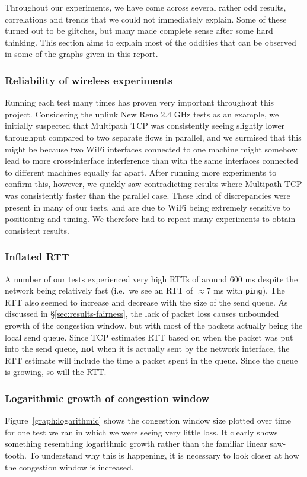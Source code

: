 Throughout our experiments, we have come across several rather odd results,
correlations and trends that we could not immediately explain. Some of these
turned out to be glitches, but many made complete sense after some hard
thinking. This section aims to explain most of the oddities that can be observed
in some of the graphs given in this report.

\subsubsection{Reliability of wireless experiments}
Running each test many times has proven very important throughout this project.
Considering the uplink New Reno 2.4 GHz tests as an example, we initially 
suspected that Multipath TCP was consistently seeing slightly lower 
throughput compared to two separate flows in parallel, and we surmised that
this might be because two 
WiFi interfaces connected to one machine might somehow lead to more 
cross-interface interference than with the same interfaces connected to 
different machines equally far apart. After running more experiments to confirm this, 
however, we quickly saw contradicting results where Multipath TCP was 
consistently faster than the parallel case. These kind of discrepancies were
present in many of our tests, and are due to WiFi being extremely sensitive to
positioning and timing. We therefore had to repeat many experiments to obtain
consistent results. 

\subsubsection{Inflated RTT}
A number of our tests experienced very high RTTs of around 600 ms despite the network
being relatively fast (i.e.\ we see an RTT of $\approx 7$ ms with \texttt{ping}).
The RTT also seemed to increase and decrease with the size of the send queue. As 
discussed in \S\ref{sec:results-fairness}, the lack of packet loss causes 
unbounded growth of the congestion window, but with most of the packets actually being
the local send queue. Since TCP estimates RTT based on when the packet was put into 
the send queue, \textbf{not} when it is actually sent by the network interface, 
the RTT estimate will include the time a packet spent in the queue. Since the 
queue is growing, so will the RTT.

\subsubsection{Logarithmic growth of congestion window}
Figure~\ref{graph:logarithmic} shows the congestion window size plotted over
time for one test we ran in which we were seeing very little loss. It clearly
shows something resembling logarithmic growth rather than the familiar linear
saw-tooth. To understand why this is happening, it is necessary to look closer
at how the congestion window is increased.

